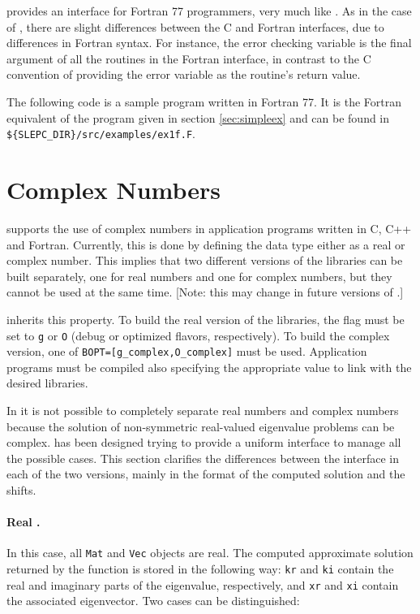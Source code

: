 	\slepc provides an interface for Fortran 77 programmers, very much like \petsc. As in the case of \petsc, there are slight differences between the C and Fortran \slepc interfaces, due to differences in Fortran syntax. For instance, the error checking variable is the final argument of all the routines in the Fortran interface, in contrast to the C convention of providing the error variable as the routine's return value.

	The following code is a sample program written in Fortran 77. It is the Fortran equivalent of the program given in section \ref{sec:simpleex} and can be found in \Verb!${SLEPC_DIR}/src/examples/ex1f.F!.

\section{Complex Numbers}
\label{sec:complex}

	\petsc{} supports the use of complex numbers in application programs written in C, C++ and Fortran. Currently, this is done by defining the data type  either as a real or complex number. This implies that two different versions of the \petsc{} libraries can be built separately, one for real numbers and one for complex numbers, but they cannot be used at the same time. [Note: this may change in future versions of \petsc.]

	\slepc inherits this property. To build the real version of the \slepc libraries, the flag  must be set to \Verb!g! or \Verb!O! (debug or optimized flavors, respectively). To build the complex version, one of \Verb!BOPT=[g_complex,O_complex]! must be used. Application programs must be compiled also specifying the appropriate  value to link with the desired libraries.

	In \slepc it is not possible to completely separate real numbers and complex numbers because the solution of non-symmetric real-valued eigenvalue problems can be complex. \slepc has been designed trying to provide a uniform interface to manage all the possible cases. This section clarifies the differences between the interface in each of the two versions, mainly in the format of the computed solution and the shifts.

\paragraph{Real \slepc.} In this case, all \texttt{Mat} and \texttt{Vec} objects are real. The computed approximate solution returned by the function  is stored in the following way: \texttt{kr} and \texttt{ki} contain the real and imaginary parts of the eigenvalue, respectively, and \texttt{xr} and \texttt{xi} contain the associated eigenvector. Two cases can be distinguished:

